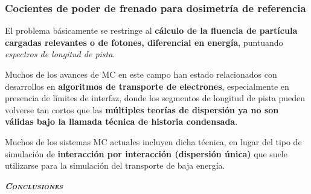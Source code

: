 \documentclass[aspectratio=169,xcolor=dvipsnames,t]{beamer}
\begin{document}
\begin{frame}
      \frametitle{Cocientes de poder de frenado para dosimetría de referencia}

      El problema básicamente se restringe al \textbf{cálculo de la fluencia de partícula cargadas relevantes o de fotones, diferencial en energía}, puntuando \textit{espectros de longitud de pista}.

      Muchos de los avances de MC en este campo han estado relacionados con desarrollos en \textbf{algoritmos de transporte de electrones}, especialmente en presencia de límites de interfaz, donde los segmentos de longitud de pista pueden volverse tan cortos que las \textbf{múltiples teorías de dispersión ya no son válidas bajo la llamada técnica de historia condensada}.

      Muchos de los sistemas MC actuales incluyen dicha técnica, en lugar del tipo de simulación de \textbf{interacción por interacción (dispersión única)} que suele utilizarse para la simulación del transporte de baja energía.
\end{frame}


\begin{frame}[standout]
      \centering\LARGE
      \textbf{\itshape\scshape Conclusiones}
\end{frame}


\End
\begin{frame}[standout,bg=white.png]
      \centering
      \printbibliography
\end{frame}
\end{document}
